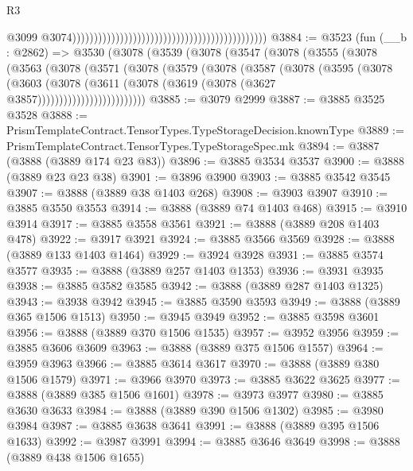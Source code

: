 \begin{lexlean}{R3}
\begin{coremodule}
                                                                                              @3099
                                                                                              @3074)))))))))))))))))))))))))))))))))))))))))))))
@3884 := @3523
    (fun (__b : @2862) =>
    @3530
      (@3078
        (@3539
          (@3078
            (@3547
              (@3078
                (@3555
                  (@3078
                    (@3563
                      (@3078
                        (@3571
                          (@3078
                            (@3579
                              (@3078
                                (@3587
                                  (@3078
                                    (@3595
                                      (@3078
                                        (@3603
                                          (@3078
                                            (@3611
                                              (@3078
                                                (@3619 (@3078 (@3627 @3857)))))))))))))))))))))))))
@3885 := @3079 @2999
@3887 := @3885 @3525 @3528
@3888 := PrismTemplateContract.TensorTypes.TypeStorageDecision.knownType
@3889 := PrismTemplateContract.TensorTypes.TypeStorageSpec.mk
@3894 := @3887 (@3888 (@3889 @174 @23 @83))
@3896 := @3885 @3534 @3537
@3900 := @3888 (@3889 @23 @23 @38)
@3901 := @3896 @3900
@3903 := @3885 @3542 @3545
@3907 := @3888 (@3889 @38 @1403 @268)
@3908 := @3903 @3907
@3910 := @3885 @3550 @3553
@3914 := @3888 (@3889 @74 @1403 @468)
@3915 := @3910 @3914
@3917 := @3885 @3558 @3561
@3921 := @3888 (@3889 @208 @1403 @478)
@3922 := @3917 @3921
@3924 := @3885 @3566 @3569
@3928 := @3888 (@3889 @133 @1403 @1464)
@3929 := @3924 @3928
@3931 := @3885 @3574 @3577
@3935 := @3888 (@3889 @257 @1403 @1353)
@3936 := @3931 @3935
@3938 := @3885 @3582 @3585
@3942 := @3888 (@3889 @287 @1403 @1325)
@3943 := @3938 @3942
@3945 := @3885 @3590 @3593
@3949 := @3888 (@3889 @365 @1506 @1513)
@3950 := @3945 @3949
@3952 := @3885 @3598 @3601
@3956 := @3888 (@3889 @370 @1506 @1535)
@3957 := @3952 @3956
@3959 := @3885 @3606 @3609
@3963 := @3888 (@3889 @375 @1506 @1557)
@3964 := @3959 @3963
@3966 := @3885 @3614 @3617
@3970 := @3888 (@3889 @380 @1506 @1579)
@3971 := @3966 @3970
@3973 := @3885 @3622 @3625
@3977 := @3888 (@3889 @385 @1506 @1601)
@3978 := @3973 @3977
@3980 := @3885 @3630 @3633
@3984 := @3888 (@3889 @390 @1506 @1302)
@3985 := @3980 @3984
@3987 := @3885 @3638 @3641
@3991 := @3888 (@3889 @395 @1506 @1633)
@3992 := @3987 @3991
@3994 := @3885 @3646 @3649
@3998 := @3888 (@3889 @438 @1506 @1655)

\end{coremodule}
\end{lexlean}
